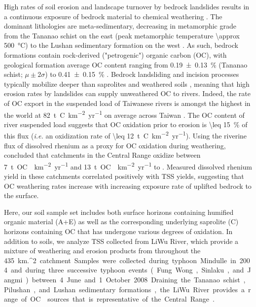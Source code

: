 High rates of soil erosion and landscape turnover by bedrock landslides \citep{Hovius:2000ht,Lin:2008fy,Hilton:2012dt} results in a continuous exposure of bedrock material to chemical weathering \citep{Hilton:2012dt,Emberson:2016fp}. The dominant lithologies are meta-sedimentary, decreasing in metamorphic grade from the Tananao schist on the east (peak metamorphic temperature \SI{\approx 500}{\celsius}) to the Lushan sedimentary formation on the west \citep[\SI{\leq 150}{\celsius}; Figure \ref{Ch6Fig:S1};][]{Beyssac:2007wg}. As such, bedrock formations contain rock-derived ("petrogenic") organic carbon (OC), with geological formation average OC content ranging from \SI{0.19 \pm 0.13}{\%} (Tananao schist; $\mu \pm 2\sigma$) to \SI{0.41 \pm 0.15}{\%} \citep[Lushan formation;][]{Hilton:2010cg}. Bedrock landsliding and incision processes typically mobilize deeper than saprolites and weathered soils \citep{Larsen:2010dr}, meaning that high erosion rates by landslides can supply unweathered OC to rivers. Indeed, the rate of OC export in the suspended load of Taiwanese rivers is amongst the highest in the world at \SI{82}{t.C.km^{-2}.yr^{-1}} on average across Taiwan \citep{Hilton:2011jw}. The OC content of river suspended load suggests that OC oxidation prior to erosion is \SI{\leq 15}{\%} of this flux (\textit{i.e.} an oxidization rate of \SI{\leq 12}{t.C.km^{-2}.yr^{-1}}). Using the riverine flux of dissolved rhenium as a proxy for OC oxidation during weathering, \citet{Hilton:2014dh} concluded that catchments in the Central Range oxidize between \SI{7}{t.OC.km^{-2}.yr^{-1}} and \SI{13}{t.OC.km^{-2}.yr^{-1}} to . Measured dissolved rhenium yield in these catchments correlated positively with TSS yields, suggesting that OC weathering rates increase with increasing exposure rate of uplifted bedrock to the surface.

Here, our soil sample set includes both surface horizons containing humified organic material (A+E) as well as the corresponding underlying saprolite (C) horizons containing OC that has undergone various degrees of oxidation. In addition to soils, we analyze TSS collected from LiWu River, which provide a mixture of weathering and erosion products from throughout the \SI{435}{km.^{2}} catchment. Samples were collected during typhoon Mindulle in 2004 and during three successive typhoon events (Fung Wong, Sinlaku, and Jangmi) between 4 June and 1 October 2008. Draining the Tananao schist, Pilushan, and Lushan sedimentary formations, the LiWu River provides a range of OC sources that is representative of the Central Range \citep{Hilton:2010cg}.

